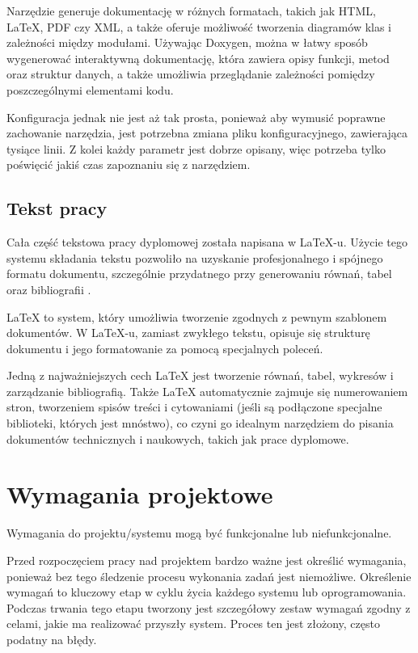 Narzędzie generuje dokumentację w różnych formatach, takich jak HTML, LaTeX, PDF czy XML, a także oferuje możliwość tworzenia diagramów klas i zależności między modułami. Używając Doxygen, można w łatwy sposób wygenerować interaktywną dokumentację, która zawiera opisy funkcji, metod oraz struktur danych, a także umożliwia przeglądanie zależności pomiędzy poszczególnymi elementami kodu.

Konfiguracja jednak nie jest aż tak prosta, ponieważ aby wymusić poprawne zachowanie narzędzia, jest potrzebna zmiana pliku konfiguracyjnego, zawierająca tysiące linii. Z kolei każdy parametr jest dobrze opisany, więc potrzeba tylko poświęcić jakiś czas zapoznaniu się z narzędziem\cite{doxygen_config}.

\subsection{Tekst pracy}
Cała część tekstowa pracy dyplomowej została napisana w \LaTeX-u. Użycie tego systemu składania tekstu pozwoliło na uzyskanie profesjonalnego i spójnego formatu dokumentu, szczególnie przydatnego przy generowaniu równań, tabel oraz bibliografii \cite{latex}.

LaTeX to system, który umożliwia tworzenie zgodnych z pewnym szablonem dokumentów. W \LaTeX-u, zamiast zwykłego tekstu, opisuje się strukturę dokumentu i jego formatowanie za pomocą specjalnych poleceń.

Jedną z najważniejszych cech LaTeX jest tworzenie równań, tabel, wykresów i zarządzanie bibliografią. Także LaTeX automatycznie zajmuje się numerowaniem stron, tworzeniem spisów treści i cytowaniami (jeśli są podłączone specjalne biblioteki, których jest mnóstwo), co czyni go idealnym narzędziem do pisania dokumentów technicznych i naukowych, takich jak prace dyplomowe.

\section{Wymagania projektowe}
Wymagania do projektu/systemu mogą być funkcjonalne lub niefunkcjonalne.

Przed rozpoczęciem pracy nad projektem bardzo ważne jest określić wymagania, ponieważ bez tego śledzenie procesu wykonania zadań jest niemożliwe. Określenie wymagań to kluczowy etap w cyklu życia każdego systemu lub oprogramowania. Podczas trwania tego etapu tworzony jest szczegółowy zestaw wymagań zgodny z celami, jakie ma realizować przyszły system. Proces ten jest złożony, często podatny na błędy.

